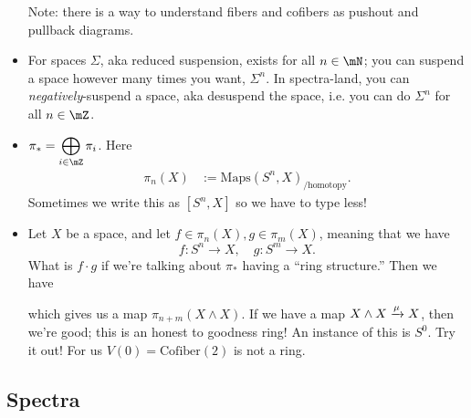 \begin{itemize}
    Note: there is a way to understand fibers and cofibers as pushout and pullback diagrams. 
    \item For spaces $\Sigma$, aka reduced suspension, exists for all $n\in \mN$; you can suspend a space however many times you want, $\Sigma^n$. In spectra-land, you can \emph{negatively}-suspend a space, aka desuspend the space, i.e. you can do $\Sigma^n$ for all $n\in \mZ$. 
    \item $\ds\pi_\ast = \bigoplus_{i\in \mZ} \pi_i$. Here \begin{align*}
        \pi_n(X)&:=\text{Maps}(S^n,X)_{/\text{homotopy}}.
    \end{align*} Sometimes we write this as $[S^n,X]$ so we have to type less!
    \item Let $X$ be a space, and let $f\in \pi_n(X), g\in \pi_m(X)$, meaning that we have $$f:S^n\to X, \quad g:S^m\to X.$$ What is $f\cdot g$ if we're talking about $\pi_\ast$ having a ``ring structure.'' Then we have 
    \begin{center}
    \end{center}
    which gives us a map $\pi_{n+m}(X\wedge X)$. If we have a map $X\wedge X \xrightarrow{\mu} X$, then we're good; this is an honest to goodness ring! An instance of this is $S^0$. Try it out! For us $V(0) = \text{Cofiber}(2)$ is not a ring. 
\end{itemize}


\newpage

\subsection{Spectra}

